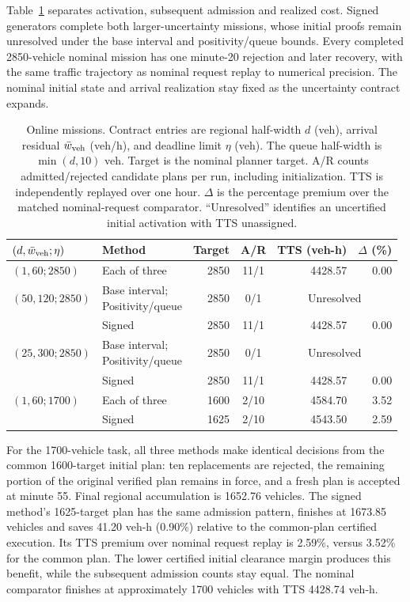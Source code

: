 \documentclass[preprint,12pt]{elsarticle}
\begin{document}
Table~\ref{tab:structure-online} separates activation, subsequent admission
and realized cost. Signed generators complete both larger-uncertainty
missions, whose initial proofs remain unresolved under the base interval and
positivity/queue bounds. Every completed 2850-vehicle nominal mission has
one minute-20 rejection and later recovery, with the same traffic trajectory
as nominal request replay to numerical precision. The nominal initial state
and arrival realization stay fixed as the
uncertainty contract expands.

\begin{table}[t]
\centering
\caption{Online missions. Contract entries are regional half-width $d$
(veh), arrival residual $\bar w_{\rm veh}$ (veh/h), and deadline limit $\eta$ (veh).
The queue half-width is $\min(d,10)$ veh. Target is the nominal planner
target. A/R counts admitted/rejected candidate plans per run, including
initialization. TTS is independently replayed over one hour. $\Delta$ is
the percentage premium over the matched nominal-request comparator.
``Unresolved'' identifies an uncertified initial activation with TTS unassigned.}
\label{tab:structure-online}
\small
\setlength{\tabcolsep}{3pt}
\begin{tabular}{@{}l l r c r r@{}}
\toprule
$(d,\bar w_{\rm veh};\eta)$ & Method & Target & A/R & TTS (veh-h) & $\Delta$ (\%)\\
\midrule
$(1,60;2850)$ & Each of three & 2850 & 11/1 & 4428.57 & 0.00\\
$(50,120;2850)$ & \shortstack[l]{Base interval;\\Positivity/queue} & 2850 & 0/1 & \multicolumn{2}{c}{Unresolved}\\
 & Signed & 2850 & 11/1 & 4428.57 & 0.00\\
$(25,300;2850)$ & \shortstack[l]{Base interval;\\Positivity/queue} & 2850 & 0/1 & \multicolumn{2}{c}{Unresolved}\\
 & Signed & 2850 & 11/1 & 4428.57 & 0.00\\
$(1,60;1700)$ & Each of three & 1600 & 2/10 & 4584.70 & 3.52\\
 & Signed & 1625 & 2/10 & 4543.50 & 2.59\\
\bottomrule
\end{tabular}
\end{table}

For the 1700-vehicle task, all three methods make identical decisions from
the common 1600-target initial plan: ten replacements are rejected,
the remaining portion of the original verified plan remains in force, and a
fresh plan is accepted at minute 55. Final regional accumulation is 1652.76 vehicles. The signed
method's 1625-target plan has the same admission pattern, finishes at
1673.85 vehicles and saves 41.20 veh-h (0.90\%) relative to the
common-plan certified execution. Its TTS premium over nominal request
replay is 2.59\%, versus 3.52\% for the common plan. The lower certified
initial clearance margin produces this benefit, while
the subsequent admission counts stay equal. The nominal comparator finishes at
approximately 1700 vehicles with TTS 4428.74 veh-h.
\end{document}
